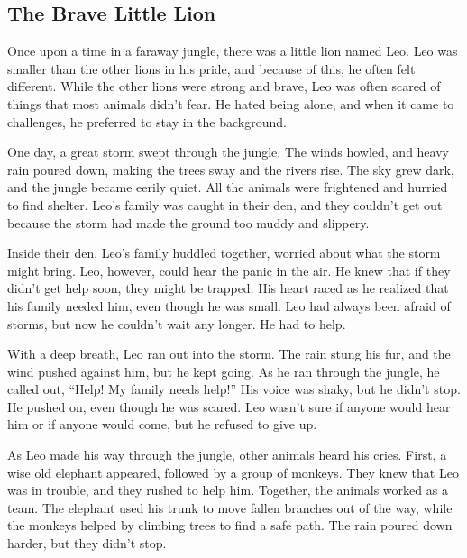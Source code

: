 \documentclass[12pt]{article}
\begin{document}
\onehalfspacing


\subsection*{The Brave Little Lion}

\begin{tcolorbox}[colframe=black!40, colback=gray!5]

\begin{spacing}{1.15}
   Once upon a time in a faraway jungle, there was a little lion named Leo. Leo was smaller than the other lions in his pride, and because of this, he often felt different. While the other lions were strong and brave, Leo was often scared of things that most animals didn’t fear. He hated being alone, and when it came to challenges, he preferred to stay in the background.

One day, a great storm swept through the jungle. The winds howled, and heavy rain poured down, making the trees sway and the rivers rise. The sky grew dark, and the jungle became eerily quiet. All the animals were frightened and hurried to find shelter. Leo’s family was caught in their den, and they couldn’t get out because the storm had made the ground too muddy and slippery.

Inside their den, Leo’s family huddled together, worried about what the storm might bring. Leo, however, could hear the panic in the air. He knew that if they didn’t get help soon, they might be trapped. His heart raced as he realized that his family needed him, even though he was small. Leo had always been afraid of storms, but now he couldn’t wait any longer. He had to help.

With a deep breath, Leo ran out into the storm. The rain stung his fur, and the wind pushed against him, but he kept going. As he ran through the jungle, he called out, “Help! My family needs help!” His voice was shaky, but he didn’t stop. He pushed on, even though he was scared. Leo wasn’t sure if anyone would hear him or if anyone would come, but he refused to give up.

As Leo made his way through the jungle, other animals heard his cries. First, a wise old elephant appeared, followed by a group of monkeys. They knew that Leo was in trouble, and they rushed to help him. Together, the animals worked as a team. The elephant used his trunk to move fallen branches out of the way, while the monkeys helped by climbing trees to find a safe path. The rain poured down harder, but they didn’t stop.


\end{spacing}
\end{tcolorbox}
\end{document}
